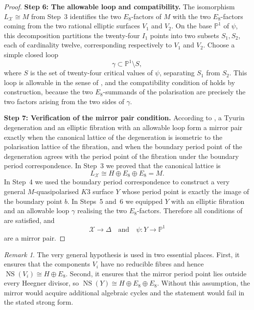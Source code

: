 \documentclass[11pt]{amsart}
\theoremstyle{plain}
\theoremstyle{remark}
\newtheorem{remark}[theorem]{Remark}
\newcommand{\NS}{\operatorname{NS}}
\newcommand{\cX}{\mathcal{X}}
\newcommand{\bbP}{\mathbb{P}}
\begin{document}
\begin{proof}
\medskip
\noindent
\textbf{Step 6: The allowable loop and compatibility.}
The isomorphism \(L_{\cX}\cong M\) from Step~3 identifies the two \(E_8\)-factors
of \(M\) with the two \(E_8\)-factors coming from the two rational elliptic
surfaces \(V_1\) and \(V_2\). On the base \(\bbP^1\) of \(\psi\), this
decomposition partitions the twenty-four \(I_1\) points into two subsets
\(S_1,S_2\), each of cardinality twelve, corresponding respectively to \(V_1\)
and \(V_2\). Choose a simple closed loop
\[
\gamma\subset \bbP^1\setminus S,
\]
where \(S\) is the set of twenty-four critical values of \(\psi\), separating
\(S_1\) from \(S_2\). This loop is allowable in the sense of
\cite[Definition~4.11]{dfk3slpms}, and the compatibility condition of
\cite[Definition~4.21]{dfk3slpms} holds by construction, because the two
\(E_8\)-summands of the polarisation are precisely the two factors arising from
the two sides of \(\gamma\).

\medskip
\noindent
\textbf{Step 7: Verification of the mirror pair condition.}
According to \cite[Definition~5.1]{dfk3slpms}, a Tyurin degeneration and an
elliptic fibration with an allowable loop form a mirror pair exactly when the
canonical lattice of the degeneration is isometric to the polarisation lattice of
the fibration, and when the boundary period point of the degeneration agrees with
the period point of the fibration under the boundary period correspondence. In
Step~3 we proved that the canonical lattice is
\[
L_{\cX}\cong H\oplus E_8\oplus E_8=M.
\]
In Step~4 we used the boundary period correspondence to construct a very general
\(M\)-quasipolarised \(K3\) surface \(Y\) whose period point is exactly the image
of the boundary point \(b\). In Steps~5 and~6 we equipped \(Y\) with an elliptic
fibration and an allowable loop \(\gamma\) realising the two \(E_8\)-factors.
Therefore all conditions of \cite[Definition~5.1]{dfk3slpms} are satisfied, and
\[
\mathcal X\to\Delta
\quad\text{and}\quad
\psi\colon Y\to\bbP^1
\]
are a mirror pair.
\end{proof}

\begin{remark}
The very general hypothesis is used in two essential places. First, it ensures
that the components \(V_i\) have no reducible fibres and hence
\(\NS(V_i)\cong H\oplus E_8\). Second, it ensures that the mirror period point
lies outside every Heegner divisor, so \(\NS(Y)\cong H\oplus E_8\oplus E_8\).
Without this assumption, the mirror would acquire additional algebraic cycles and
the statement would fail in the stated strong form.
\end{remark}
\end{document}

